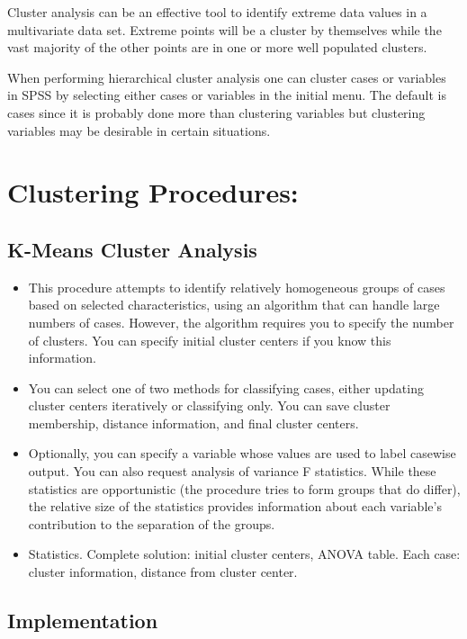 \documentclass[a4paper,12pt]{article}
\begin{document}
Cluster analysis can be an effective tool to identify extreme data values in a multivariate data set.  Extreme points will be a cluster by themselves while the vast majority of the other points are in one or more well populated clusters.  

When performing hierarchical cluster analysis one can cluster cases or variables in SPSS by selecting either cases or variables in the initial menu.  The default is cases since it is probably done more than clustering variables but clustering variables may be desirable in certain situations.  

 
 \newpage
\section*{Clustering Procedures: }

\subsection*{K-Means Cluster Analysis}
\begin{itemize}
	\item This procedure attempts to identify relatively homogeneous groups of cases based on selected characteristics, using an algorithm that can handle large numbers of cases. However, the algorithm requires you to specify the number of clusters. You can specify initial cluster centers if you know this information. \item You can select one of two methods for classifying cases, either updating cluster centers iteratively or classifying only. You can save cluster membership, distance information, and final cluster centers. \item Optionally, you can specify a variable whose values are used to label casewise output. You can also request analysis of variance F statistics. While these statistics are opportunistic (the procedure tries to form groups that do differ), the relative size of the statistics provides information about each variable's contribution to the separation of the groups.
	
	\item Statistics. Complete solution: initial cluster centers, ANOVA table.  Each case: cluster information, distance from cluster center.
\end{itemize}



\subsection*{Implementation}
\end{document}
